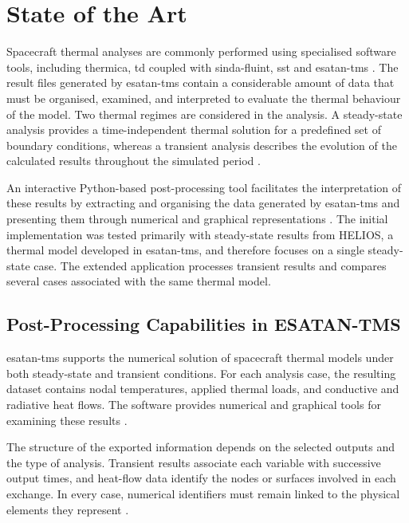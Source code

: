 \chapter{State of the Art} 
\label{ch:state_of_the_art} 

Spacecraft thermal analyses are commonly performed using specialised software 
tools, including \acrshort{thermica}, \acrfull{td} coupled with 
\acrshort{sinda-fluint}, \acrshort{sst} and \acrshort{esatan-tms}
\cite{soriano2007thermica,wang2020shiiver,zarei2020simcenter}.
The result files generated by \acrshort{esatan-tms} contain a considerable amount of data 
that must be organised, examined, and interpreted to evaluate the thermal 
behaviour of the model. Two thermal regimes are considered in the
analysis. A steady-state analysis provides a time-independent thermal solution
for a predefined set of boundary conditions, whereas a transient analysis
describes the evolution of the calculated results throughout the simulated
period \cite{thermal_eng_man,esatan_user_man}.

An interactive Python-based post-processing tool facilitates the
interpretation of these results by extracting and organising the data generated
by \acrshort{esatan-tms} and presenting them through numerical and graphical
representations \cite{tfg_carol}. The initial implementation was tested
primarily with steady-state results from HELIOS, a thermal model developed in
\acrshort{esatan-tms}, and therefore focuses on a single steady-state case. The
extended application processes transient results and compares several cases
associated with the same thermal model.


\section{Post-Processing Capabilities in ESATAN-TMS} 
\label{sec:esatan_postprocessing} 

\acrshort{esatan-tms} supports the numerical solution of spacecraft thermal
models under both steady-state and transient conditions. For each analysis
case, the resulting dataset contains nodal temperatures, applied thermal loads, 
and conductive and radiative heat flows. The software provides numerical and 
graphical tools for examining these results 
\cite{esatan_user_man,esatan_training_man}.

The structure of the exported information depends on the selected outputs and
the type of analysis. Transient results associate each variable with successive
output times, and heat-flow data identify the nodes or surfaces involved in each
exchange. In every case, numerical identifiers must remain linked to the physical
elements they represent
\cite{esatan_user_man,esatan_training_man}.

